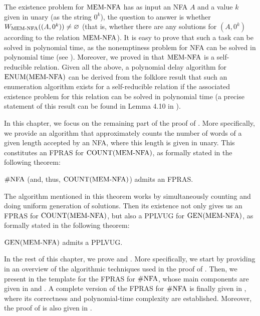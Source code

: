 \documentclass[11pt,twoside=off,numbers=noenddot]{scrbook}
\begin{document}
The existence problem for $\text{MEM-NFA}$ has as input an NFA $A$ and a value $k$ given in unary (as the string $0^k$), the question to answer is whether $W_{\text{MEM-NFA}}((A, 0^k)) \neq \varnothing$ (that is, whether there are any solutions for $(A, 0^k)$ according to the relation $\text{MEM-NFA}$). It is easy to prove that such a task can be solved in polynomial time, as the nonemptiness problem for NFA can be solved in polynomial time (see \cite{hopcroft2001introduction}). Moreover, we proved in  that $\text{MEM-NFA}$ is a self-reducible relation. Given all the above, a polynomial delay algorithm for $\text{ENUM}(\text{MEM-NFA})$ can be derived from the folklore result that such an enumeration algorithm exists for a self-reducible relation if the associated existence problem for this relation can be solved in polynomial time (a precise statement of this result can be found in Lemma 4.10 in \cite{schmidt2009enumeration}).

In this chapter, we focus on the remaining part of the proof of . More specifically, we provide an algorithm that approximately counts the number of words of a given length accepted by an NFA, where this length is given in unary. This constitutes an FPRAS for $\text{COUNT}(\text{MEM-NFA})$, as formally stated in the following theorem:

\begin{theorem}
    $\text{\#NFA}$ (and, thus, $\text{COUNT}(\text{MEM-NFA})$) admits an FPRAS.
\end{theorem}

The algorithm mentioned in this theorem works by simultaneously counting and doing uniform generation of solutions. Then its existence not only gives us an FPRAS for $\text{COUNT}(\text{MEM-NFA})$, but also a PPLVUG for $\text{GEN}(\text{MEM-NFA})$, as formally stated in the following theorem:

\begin{theorem}
    $\text{GEN}(\text{MEM-NFA})$ admits a PPLVUG.
\end{theorem}

In the rest of this chapter, we prove  and . More specifically, we start by providing in  an overview of the algorithmic techniques used in the proof of . Then, we present in  the template for the FPRAS for $\text{\#NFA}$, whose main components are given in  and . A complete version of the FPRAS for $\text{\#NFA}$ is finally given in , where its correctness and polynomial-time complexity are established. Moreover, the proof of  is also given in .
\end{document}

